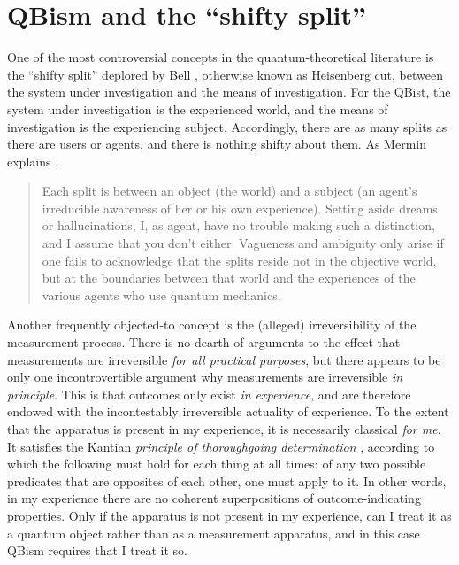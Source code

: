\documentclass[12pt]{article}
\newcommand{\bq}{\begin{quote}}
\newcommand{\eq}{\end{quote}}
\begin{document}
\section{QBism and the ``shifty split''}\label{sec_shifty}
One of the most controversial concepts in the quantum-theoretical literature is  the ``shifty split'' deplored by Bell \cite{Bell90}, otherwise known as Heisenberg cut, between the system under investigation and the means of investigation. For the QBist, the system under investigation is the experienced world, and the means of investigation is the experiencing subject. Accordingly, there are as many splits as there are users or agents, and there is nothing shifty about them. As Mermin explains \cite{Mermin_shifty},
\bq
Each split is between an object (the world) and a subject (an agent's irreducible awareness of her or his own experience). Setting aside dreams or hallucinations, I, as agent, have no trouble making such a distinction, and I assume that you don't either. Vagueness and ambiguity only arise if one fails to acknowledge that the splits reside not in the objective world, but at the boundaries between that world and the experiences of the various agents who use quantum mechanics.
\eq
Another frequently objected-to concept is the (alleged) irreversibility of the {measurement process}. There is no dearth of arguments to the effect that measurements are irreversible \emph{for all practical purposes}, but there appears to be only one incontrovertible argument why measurements are irreversible \emph{in principle}. This is that outcomes only exist \emph{in experience}, and are therefore endowed with the incontestably irreversible actuality of experience. To the extent that the apparatus is present in {my} experience, it is necessarily classical \emph{for me}. It satisfies the Kantian \emph{principle of thoroughgoing determination} \cite{KantCPR1}, according to which the following must hold for each thing at all times: of any two possible predicates that are opposites of each other, one must apply to it. In other words, in my experience there are no coherent superpositions of {outcome-indicating} properties. Only if the apparatus is not present in my experience, can I treat it as a quantum object rather than as a measurement apparatus, and in this case QBism requires that I treat it so.
\end{document}
